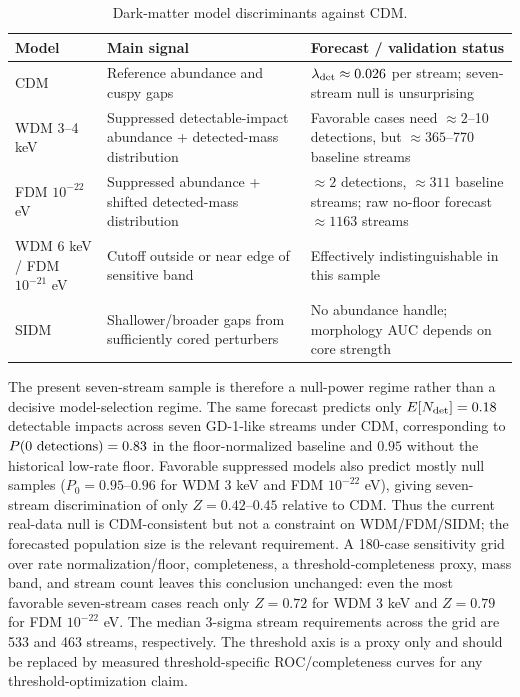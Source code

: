 \documentclass[fleqn,usenatbib]{mnras}
\begin{document}
\begin{table}
\caption{Dark-matter model discriminants against CDM.}
\label{tab:dm-discriminants}
\begin{tabular}{lll}
\hline
Model & Main signal & Forecast / validation status\\
\hline
CDM & Reference abundance and cuspy gaps & $\lambda_{\rm det}\approx0.026$ per stream; seven-stream null is unsurprising\\
WDM 3--4 keV & Suppressed detectable-impact abundance + detected-mass distribution & Favorable cases need ${\approx}2$--10 detections, but ${\approx}365$--770 baseline streams\\
FDM $10^{-22}$ eV & Suppressed abundance + shifted detected-mass distribution & ${\approx}2$ detections, ${\approx}311$ baseline streams; raw no-floor forecast ${\approx}1163$ streams\\
WDM 6 keV / FDM $10^{-21}$ eV & Cutoff outside or near edge of sensitive band & Effectively indistinguishable in this sample\\
SIDM & Shallower/broader gaps from sufficiently cored perturbers & No abundance handle; morphology AUC depends on core strength\\
\hline
\end{tabular}
\end{table}

The present seven-stream sample is therefore a null-power regime rather than a decisive
model-selection regime. The same forecast predicts only $E[N_{\rm det}]=0.18$ detectable
impacts across seven GD-1-like streams under CDM, corresponding to
$P(0~{\rm detections})=0.83$ in the floor-normalized baseline and $0.95$ without the
historical low-rate floor. Favorable suppressed models also predict mostly null samples
($P_0=0.95$--$0.96$ for WDM 3 keV and FDM $10^{-22}$ eV), giving seven-stream
discrimination of only $Z=0.42$--$0.45$ relative to CDM. Thus the current real-data null
is CDM-consistent but not a constraint on WDM/FDM/SIDM; the forecasted population size is
the relevant requirement.
A 180-case sensitivity grid over rate normalization/floor, completeness, a
threshold-completeness proxy, mass band, and stream count leaves this conclusion unchanged:
even the most favorable seven-stream cases reach only $Z=0.72$ for WDM 3 keV and
$Z=0.79$ for FDM $10^{-22}$ eV. The median 3-sigma stream requirements across the grid
are 533 and 463 streams, respectively. The threshold axis is a proxy only and should be
replaced by measured threshold-specific ROC/completeness curves for any
threshold-optimization claim.
\end{document}
